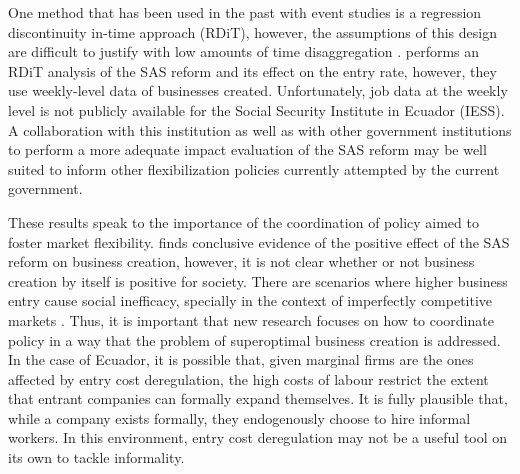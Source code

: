 \documentclass[11pt,a4paper]{article}\usepackage[]{graphicx}\usepackage[]{xcolor}
\begin{document}
One method that has been used in the past with event studies is a regression discontinuity in-time approach (RDiT), however, the assumptions of this design are difficult to justify with low amounts of time disaggregation \parencite{Hausman.2018}. \textcite{CaminoMogro.2022} performs an RDiT analysis of the SAS reform and its effect on the entry rate, however, they use weekly-level data of businesses created. Unfortunately, job data at the weekly level is not publicly available for the Social Security Institute in Ecuador (IESS). A collaboration with this institution as well as with other government institutions to perform a more adequate impact evaluation of the SAS reform may be well suited to inform other flexibilization policies currently attempted by the current government. 

These results speak to the importance of the coordination of policy aimed to foster market flexibility. \textcite{CaminoMogro.2022} finds conclusive evidence of the positive effect of the SAS reform on business creation, however, it is not clear whether or not business creation by itself is positive for society. There are scenarios where higher business entry cause social inefficacy, specially in the context of imperfectly competitive markets \parencite{Mankiw.1986}. Thus, it is important that new research focuses on how to coordinate policy in a way that the problem of superoptimal business creation is addressed. In the case of Ecuador, it is possible that, given marginal firms are the ones affected by entry cost deregulation, the high costs of labour restrict the extent that entrant companies can formally expand themselves. It is fully plausible that, while a company exists formally, they endogenously choose to hire informal workers. In this environment, entry cost deregulation may not be a useful tool on its own to tackle informality. 
\printbibliography
\clearpage
\end{document}
